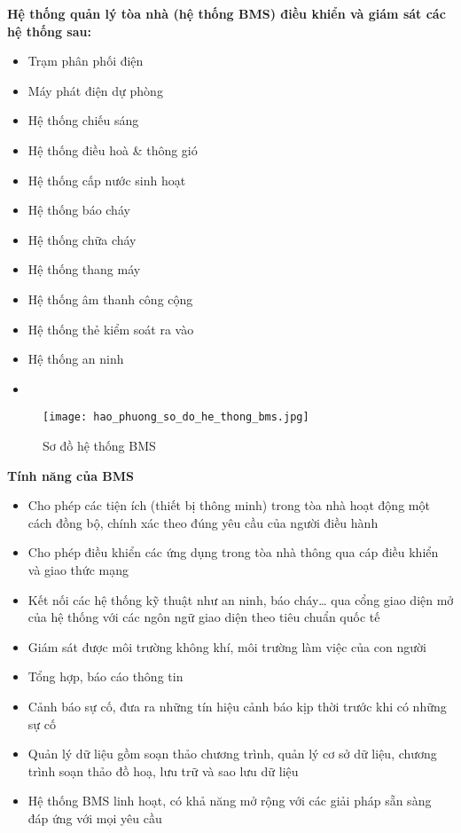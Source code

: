 	\break
	\textbf{Hệ thống quản lý tòa nhà (hệ thống BMS) điều khiển và giám sát các hệ thống sau:}
\begin{multicols}{2}
	\begin{itemize}
		\item Trạm phân phối điện
		\item Máy phát điện dự phòng
		\item Hệ thống chiếu sáng
		\item Hệ thống điều hoà \& thông gió
		\item Hệ thống cấp nước sinh hoạt
		\item Hệ thống báo cháy
		\item Hệ thống chữa cháy
		\item Hệ thống thang máy
		\item Hệ thống âm thanh công cộng
		\item Hệ thống thẻ kiểm soát ra vào
		\item Hệ thống an ninh
		\item[\vspace{\fill}] %
	\end{itemize}
\end{multicols}
	
	\begin{figure}[H]
		\centering
		\texttt{[image: hao\_phuong\_so\_do\_he\_thong\_bms.jpg]}	
		\caption{Sơ đồ hệ thống BMS}
	\end{figure}

	\textbf{Tính năng của BMS}
\begin{itemize}[leftmargin=2cm]
	\item Cho phép các tiện ích (thiết bị thông minh) trong tòa nhà hoạt động một cách đồng bộ, chính xác theo đúng yêu cầu của người điều hành
	
	\item Cho phép điều khiển các ứng dụng trong tòa nhà thông qua cáp điều khiển và giao thức mạng
	
	\item Kết nối các hệ thống kỹ thuật như an ninh, báo cháy… qua cổng giao diện mở của hệ thống với các ngôn ngữ giao diện theo tiêu chuẩn quốc tế
	
	\item Giám sát được môi trường không khí, môi trường làm việc của con người
	
	\item Tổng hợp, báo cáo thông tin
	
	\item Cảnh báo sự cố, đưa ra những tín hiệu cảnh báo kịp thời trước khi có những sự cố
	
	\item Quản lý dữ liệu gồm soạn thảo chương trình, quản lý cơ sở dữ liệu, chương trình soạn thảo đồ hoạ, lưu trữ và sao lưu dữ liệu
	
	\item Hệ thống BMS linh hoạt, có khả năng mở rộng với các giải pháp sẵn sàng đáp ứng với mọi yêu cầu
\end{itemize}

